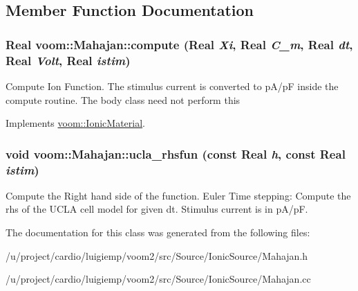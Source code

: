\subsection{Member Function Documentation}
\hypertarget{classvoom_1_1_mahajan_af69275575333c5b53c6485b090f77041}{
\subsubsection[{compute}]{\setlength{\rightskip}{0pt plus 5cm}Real voom::Mahajan::compute (Real {\em Xi}, \/  Real {\em C\_\-m}, \/  Real {\em dt}, \/  Real {\em Volt}, \/  Real {\em istim})}}
\label{classvoom_1_1_mahajan_af69275575333c5b53c6485b090f77041}
Compute Ion Function. The stimulus current is converted to pA/pF inside the compute routine. The body class need not perform this 

Implements \hyperlink{classvoom_1_1_ionic_material_a1b95cf90af115374b428f2e5ece571cb}{voom::IonicMaterial}.\hypertarget{classvoom_1_1_mahajan_a823f525969c509dc65b22f1f88efe173}{
\subsubsection[{ucla\_\-rhsfun}]{\setlength{\rightskip}{0pt plus 5cm}void voom::Mahajan::ucla\_\-rhsfun (const Real {\em h}, \/  const Real {\em istim})}}
\label{classvoom_1_1_mahajan_a823f525969c509dc65b22f1f88efe173}


Compute the Right hand side of the function. Euler Time stepping: Compute the rhs of the UCLA cell model for given dt. Stimulus current is in pA/pF. 

The documentation for this class was generated from the following files:\begin{DoxyCompactItemize}
\item 
/u/project/cardio/luigiemp/voom2/src/Source/IonicSource/Mahajan.h\item 
/u/project/cardio/luigiemp/voom2/src/Source/IonicSource/Mahajan.cc\end{DoxyCompactItemize}
